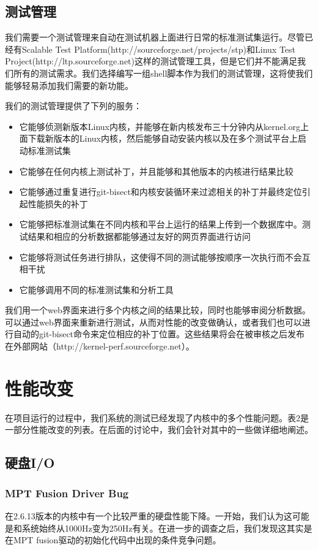\subsection{测试管理}
我们需要一个测试管理来自动在测试机器上面进行日常的标准测试集运行。尽管已经有Scalable Test Platform(http://sourceforge.net/projects/stp)和Linux Test Project(http://ltp.sourceforge.net)这样的测试管理工具，但是它们并不能满足我们所有的测试需求。我们选择编写一组shell脚本作为我们的测试管理，这将使我们能够轻易添加我们需要的新功能。

我们的测试管理提供了下列的服务：
\begin{itemize}
\item 它能够侦测新版本Linux内核，并能够在新内核发布三十分钟内从kernel.org上面下载新版本的Linux内核，然后能够自动安装内核以及在多个测试平台上启动标准测试集
\item 它能够在任何内核上测试补丁，并且能够和其他版本的内核进行结果比较
\item 它能够通过重复进行git-bisect和内核安装循环来过滤相关的补丁并最终定位引起性能损失的补丁
\item 它能够把标准测试集在不同内核和平台上运行的结果上传到一个数据库中。测试结果和相应的分析数据都能够通过友好的网页界面进行访问
\item 它能够将测试任务进行排队，这使得不同的测试能够按顺序一次执行而不会互相干扰
\item 它能够调用不同的标准测试集和分析工具
\end{itemize}

我们用一个web界面来进行多个内核之间的结果比较，同时也能够审阅分析数据。可以通过web界面来重新进行测试，从而对性能的改变做确认，或者我们也可以进行自动的git-bisect命令来定位相应的补丁位置。这些结果将会在被审核之后发布在外部网站（http://kernel-perf.sourceforge.net）。


\section{性能改变}
在项目运行的过程中，我们系统的测试已经发现了内核中的多个性能问题。表2是一部分性能改变的列表。在后面的讨论中，我们会针对其中的一些做详细地阐述。
\subsection{硬盘I/O}
\subsubsection{MPT Fusion Driver Bug}
在2.6.13版本的内核中有一个比较严重的硬盘性能下降。一开始，我们认为这可能是和系统始终从1000Hz变为250Hz有关。在进一步的调查之后，我们发现这其实是在MPT fusion驱动的初始化代码中出现的条件竞争问题。

